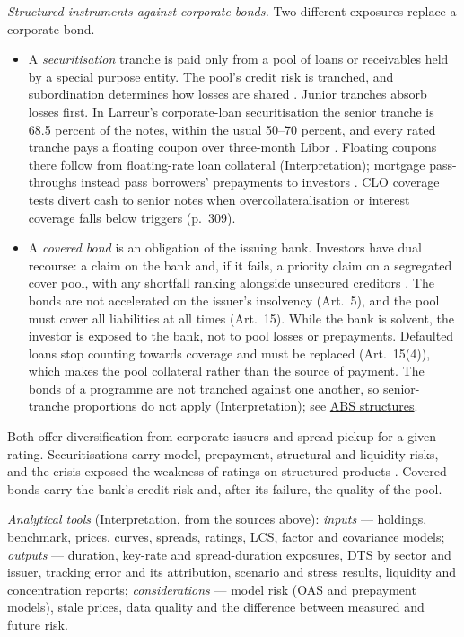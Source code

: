 \begin{qfmethod}
\emph{Structured instruments against corporate bonds.} Two different exposures replace a corporate bond.
\begin{itemize}
\item A \emph{securitisation} tranche is paid only from a pool of loans or receivables held by a special purpose entity. The pool's credit risk is tranched, and subordination determines how losses are shared \citep[Art.~2(1)]{eu-2017-2402-securitisation}. Junior tranches absorb losses first. In Larreur's corporate-loan securitisation the senior tranche is 68.5 percent of the notes, within the usual 50--70 percent, and every rated tranche pays a floating coupon over three-month Libor \citep[pp.~256--260, Table~10.1]{larreur-structured-finance-2021}. Floating coupons there follow from floating-rate loan collateral (Interpretation); mortgage pass-throughs instead pass borrowers' prepayments to investors \citep[pp.~7, 10]{wide-fuster-mbs-review}. CLO coverage tests divert cash to senior notes when overcollateralisation or interest coverage falls below triggers (p.~309).
\item A \emph{covered bond} is an obligation of the issuing bank. Investors have dual recourse: a claim on the bank and, if it fails, a priority claim on a segregated cover pool, with any shortfall ranking alongside unsecured creditors \citep[Art.~4]{eu-dir-2019-2162-covered-bonds}. The bonds are not accelerated on the issuer's insolvency (Art.~5), and the pool must cover all liabilities at all times (Art.~15). While the bank is solvent, the investor is exposed to the bank, not to pool losses or prepayments. Defaulted loans stop counting towards coverage and must be replaced (Art.~15(4)), which makes the pool collateral rather than the source of payment. The bonds of a programme are not tranched against one another, so senior-tranche proportions do not apply (Interpretation); see \hyperref[meth:abs-structures-credit-enhancement]{ABS structures}.
\end{itemize}
Both offer diversification from corporate issuers and spread pickup for a given rating. Securitisations carry model, prepayment, structural and liquidity risks, and the crisis exposed the weakness of ratings on structured products \citep[p.~257]{ben-dor-credit-portfolio-2012}. Covered bonds carry the bank's credit risk and, after its failure, the quality of the pool.

\emph{Analytical tools} (Interpretation, from the sources above): \emph{inputs} --- holdings, benchmark, prices, curves, spreads, ratings, LCS, factor and covariance models; \emph{outputs} --- duration, key-rate and spread-duration exposures, DTS by sector and issuer, tracking error and its attribution, scenario and stress results, liquidity and concentration reports; \emph{considerations} --- model risk (OAS and prepayment models), stale prices, data quality and the difference between measured and future risk.


\end{qfmethod}
